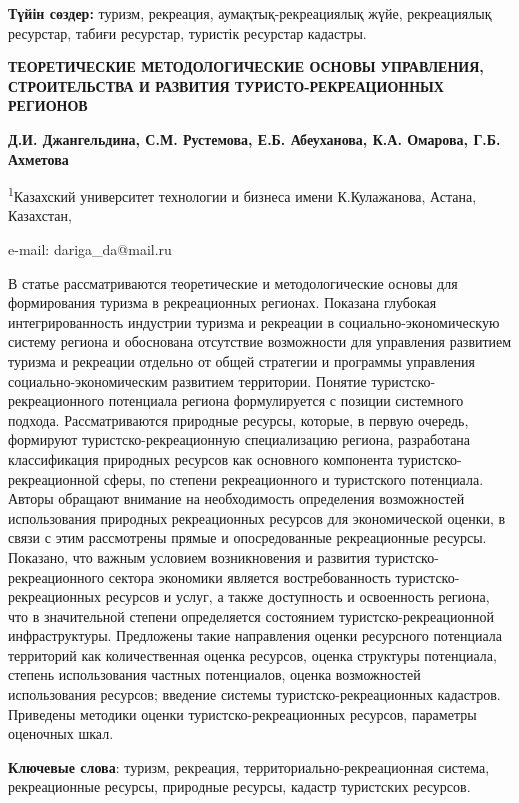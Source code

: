 {\bfseries Түйін сөздер:} туризм, рекреация, аумақтық-рекреациялық жүйе,
рекреациялық ресурстар, табиғи ресурстар, туристік ресурстар кадастры.

\begin{center}
{\large\bfseries ТЕОРЕТИЧЕСКИЕ МЕТОДОЛОГИЧЕСКИЕ ОСНОВЫ УПРАВЛЕНИЯ, СТРОИТЕЛЬСТВА
И РАЗВИТИЯ ТУРИСТО-РЕКРЕАЦИОННЫХ РЕГИОНОВ}

{\bfseries Д.И. Джангельдина\envelope, С.М. Рустемова, Е.Б. Абеуханова, К.А. Омарова, Г.Б. Ахметова}

\textsuperscript{1}Казахский университет технологии и бизнеса имени
К.Кулажанова, Астана, Казахстан,

e-mail: dariga\_da@mail.ru
\end{center}

В статье рассматриваются теоретические и методологические основы для
формирования туризма в рекреационных регионах. Показана глубокая
интегрированность индустрии туризма и рекреации в
социально-экономическую систему региона и обоснована отсутствие
возможности для управления развитием туризма и рекреации отдельно от
общей стратегии и программы управления социально-экономическим развитием
территории. Понятие туристско-рекреационного потенциала региона
формулируется с позиции системного подхода. Рассматриваются природные
ресурсы, которые, в первую очередь, формируют туристско-рекреационную
специализацию региона, разработана классификация природных ресурсов как
основного компонента туристско-рекреационной сферы, по степени
рекреационного и туристского потенциала. Авторы обращают внимание на
необходимость определения возможностей использования природных
рекреационных ресурсов для экономической оценки, в связи с этим
рассмотрены прямые и опосредованные рекреационные ресурсы. Показано, что
важным условием возникновения и развития туристско-рекреационного
сектора экономики является востребованность туристско-рекреационных
ресурсов и услуг, а также доступность и освоенность региона, что в
значительной степени определяется состоянием туристско-рекреационной
инфраструктуры. Предложены такие направления оценки ресурсного
потенциала территорий как количественная оценка ресурсов, оценка
структуры потенциала, степень использования частных потенциалов, оценка
возможностей использования ресурсов; введение системы
туристско-рекреационных кадастров. Приведены методики оценки
туристско-рекреационных ресурсов, параметры оценочных шкал.

{\bfseries Ключевые слова}: туризм, рекреация, территориально-рекреационная
система, рекреационные ресурсы, природные ресурсы, кадастр туристских
ресурсов.


